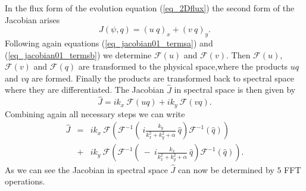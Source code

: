 In the flux form of the evolution equation ({\ref{eq_2Dflux}})
the second form of the Jacobian arises
\begin{equation} \label{eq_jacobian02}
  J(\psi,q) = (u \ q)_{x} + (v \ q)_{y}.
\end{equation}
Following again equations (\ref{eq_jacobian01_termsa}) and 
(\ref{eq_jacobian01_termsb}) we determine $\mathcal{F}(u)$ and
$\mathcal{F}(v)$. Then $\mathcal{F}(u)$, $\mathcal{F}(v)$ and 
$\mathcal{F}(q)$ are transformed to the physical
space,where the products $uq$ and $vq$ are formed. Finally the
products are transformed back to spectral space where they 
are differentiated. The Jacobian $\hat{J}$ in spectral space is
then given by
\begin{equation} \label{eq_jacobian02_J}
  \hat{J}
   = 
  i  k_{x} \ \mathcal{F}(uq)
   + 
  i  k_{y} \ \mathcal{F}(vq).
\end{equation}
Combining again all necessary steps we can write
\begin{eqnarray} \nonumber
  \hat{J} 
   &=&
  ik_{x} \ 
  \mathcal{F}
   \left(
    \mathcal{F}^{-1} 
     \left(
     \ i \frac{k_{y}}{k^{2}_{x}+k^{2}_{y}+\alpha} \ 
      \hat{q}
     \right) 
     \mathcal{F}^{-1}
      \left( \hat{q} \right)
   \right)
    \\ \label{eq_jacobian02_Jall}
   &+&
  ik_{y} \ 
  \mathcal{F}
   \left(
    \mathcal{F}^{-1} 
     \left(
      \ - \ i \frac{k_{x}}{k^{2}_{x}+k^{2}_{y}+\alpha} \ 
      \hat{q}
     \right) 
     \mathcal{F}^{-1}
      \left( \hat{q} \right)
   \right).
\end{eqnarray}
As we can see the Jacobian in spectral space $\hat{J}$ can now be 
determined by $5$ FFT operations.

